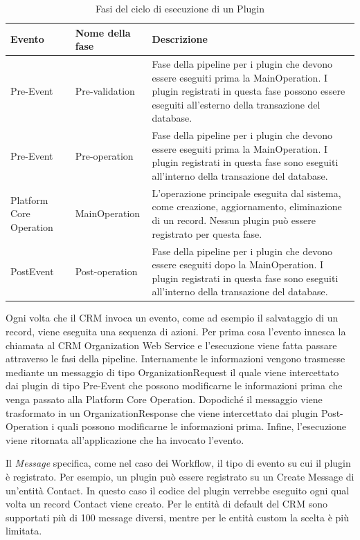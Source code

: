 \begin{table}[ht!]
  \centering
  \begin{tabular}{p{}lp{}}
    \toprule
      \textbf{Evento} & \textbf{Nome della fase} & \textbf{Descrizione} \\
    \midrule
      Pre-Event & Pre-validation &  Fase della pipeline per i plugin che devono essere eseguiti prima la MainOperation. I plugin registrati in questa fase possono essere eseguiti all'esterno della transazione del database. \\
    \midrule
      Pre-Event & Pre-operation & Fase della pipeline per i plugin che devono essere eseguiti prima la MainOperation. I plugin registrati in questa fase sono eseguiti all'interno della transazione del database. \\
    \midrule
      Platform Core Operation & MainOperation &  L'operazione principale eseguita dal sistema, come creazione, aggiornamento, eliminazione di un record. Nessun plugin può essere registrato per questa fase. \\
    \midrule
      PostEvent & Post-operation &  Fase della pipeline per i plugin che devono essere eseguiti dopo la MainOperation. I plugin registrati in questa fase sono eseguiti all'interno della transazione del database. \\
    \bottomrule
  \end{tabular}
  \caption{Fasi del ciclo di esecuzione di un Plugin}
  \label{table:pluginStages}
\end{table}

Ogni volta che il CRM invoca un evento, come ad esempio il salvataggio di un record, viene eseguita una sequenza di azioni.
Per prima cosa l'evento innesca la chiamata al CRM Organization Web Service e l'esecuzione viene fatta passare attraverso le fasi della pipeline. Internamente le informazioni vengono trasmesse mediante un messaggio di tipo OrganizationRequest il quale viene intercettato dai plugin di tipo Pre-Event che possono modificarne le informazioni prima che venga passato alla Platform Core Operation. Dopodiché il messaggio viene trasformato in un OrganizationResponse che viene intercettato dai plugin Post-Operation i quali possono modificarne le informazioni prima.
Infine, l'esecuzione viene ritornata all'applicazione che ha invocato l'evento.

Il \textit{Message} specifica, come nel caso dei Workflow, il tipo di evento su cui il plugin è registrato. Per esempio, un plugin può essere registrato su un Create Message di un'entità Contact. In questo caso il codice del plugin verrebbe eseguito ogni qual volta un record Contact viene creato. Per le entità di default del CRM sono supportati più di 100 message diversi, mentre per le entità custom la scelta è più limitata.

